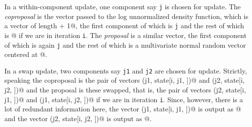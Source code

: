 \documentclass{article}
\begin{document}
In a within-component update, one component say \texttt{j} is chosen for
update.  The \emph{coproposal} is the vector passed to the log unnormalized
density function, which is a vector of length \verb@d + 1@, the first
component of which is \texttt{j} and the rest of which is \verb@state[i, j, ]@
if we are in iteration \texttt{i}.
The \emph{proposal} is a similar vector, the first
component of which is again \texttt{j} and the rest of which is a multivariate
normal random vector centered at \verb@state[i, j, ]@.

In a swap update, two components say \texttt{j1} and \texttt{j2} are chosen for
update.  Strictly, speaking the coproposal is the pair of vectors
\verb@c(j1, state[i, j1, ])@ and \verb@c(j2, state[i, j2, ])@
and the proposal is these swapped, that is, the pair of vectors
\verb@c(j2, state[i, j1, ])@ and \verb@c(j1, state[i, j2, ])@
if we are in iteration \texttt{i}.
Since, however, there is a lot of redundant information here,
the vector \verb@c(j1, state[i, j1, ])@ is output as \verb@coproposal[i, ]@
and the vector \verb@c(j2, state[i, j2, ])@ is output as \verb@proposal[i, ]@.
\end{document}
